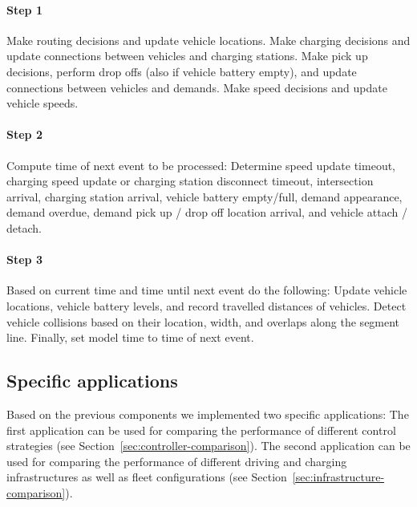 \documentclass[a4paper,twoside]{article}
\begin{document}
	\paragraph{Step 1}
	
	Make routing decisions and update vehicle locations.
	Make charging decisions and update connections between vehicles and charging stations.
	Make pick up decisions, perform drop offs (also if vehicle battery empty), and update connections between vehicles and demands.
	Make speed decisions and update vehicle speeds.
	
	\paragraph{Step 2}
	
	Compute time of next event to be processed:
	Determine speed update timeout,
	charging speed update or charging station disconnect timeout,
	intersection arrival,
	charging station arrival,
	vehicle battery empty/full,
	demand appearance,
	demand overdue,
	demand pick up / drop off location arrival, and
	vehicle attach / detach.
	
	\paragraph{Step 3}
	
	Based on current time and time until next event do the following:
	Update vehicle locations, vehicle battery levels, and record travelled distances of vehicles.
	Detect vehicle collisions based on their location, width, and overlaps along the segment line.
	Finally, set model time to time of next event.
	
	\subsection{Specific applications}
	\label{sec:application}
	
	Based on the previous components we implemented two specific applications:
	The first application can be used for comparing the performance of different control strategies (see Section~\ref{sec:controller-comparison}).
	The second application can be used for comparing the performance of different driving and charging infrastructures as well as fleet configurations (see Section~\ref{sec:infrastructure-comparison}).

%
	
\end{document}
